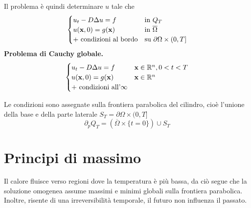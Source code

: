 Il problema è quindi determinare $u$ tale che
\begin{equation*}
    \begin{cases}
        u_{t} -D\Delta u=f            & \text{in} \ Q_{T}                        \\
        u(\x,0) =g(\x)                & \text{in} \ \overline{\Omega }           \\
        +\ \text{condizioni al bordo} & \text{su} \ \partial \Omega \times (0,T]
    \end{cases}
\end{equation*}
\textbf{Problema di Cauchy globale.}
\begin{equation*}
    \begin{cases}
        u_{t} -D\Delta u=f              & \mathbf{x} \in \mathbb{R}^{n},0< t< T \\
        u(\mathbf{x},0) =g(\mathbf{x})                  & \mathbf{x} \in \mathbb{R}^{n}         \\
        +\ \text{condizioni all'}\infty &
    \end{cases}
\end{equation*}
\begin{definition}
     Le condizioni sono assegnate sulla frontiera parabolica del cilindro, cioè l'unione della base e della parte laterale $S_{T} =\partial \Omega \times (0,T]$
    \begin{equation*}
        \partial _{p} Q_{T} =(\overline{\Omega } \times \{t=0\}) \cup S_{T}
    \end{equation*}
\end{definition}
\section{Principi di massimo}

Il calore fluisce verso regioni dove la temperatura è più bassa, da ciò segue che la soluzione omogenea assume massimi e minimi globali sulla frontiera parabolica. Inoltre, risente di una irreversibilità temporale, il futuro non influenza il passato.

